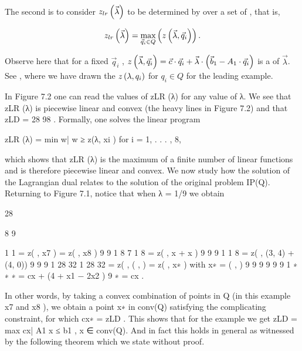 \paragraph{}
The second  is to consider $z_{lr}\left( \vec{\lambda} \right)$ to be determined by  over a set of , that is,

\begin{equation}
z_{lr}\left( \vec{\lambda} \right)=\max_{\vec{q}_i\in Q}\left( z\left( \vec{\lambda},\vec{q}_i \right) \right).
\end{equation}

Observe here that for a fixed $\vec{q}_i$ , $z\left( \vec{\lambda},\vec{q}_i \right)=\vec{c}\cdot\vec{q}_i+\vec{\lambda}\cdot\left( \vec{b}_1-A_1\cdot\vec{q}_i \right)$ is a  of $\vec{\lambda}$. See , where we have drawn the  $z\left( \lambda,q_i \right)$ for $q_i\in Q$ for the leading example.



In Figure 7.2 one can read the values of zLR (λ) for any value of λ. We see that zLR (λ) is piecewise linear
and convex (the heavy lines in Figure 7.2) and that zLD = 28 98 . Formally, one solves the linear program

zLR (λ) = min {w| w ≥ z(λ, xi ) for i = 1, . . . , 8},

which shows that zLR (λ) is the maximum of a finite number of linear functions and is therefore piecewise
linear and convex.
We now study how the solution of the Lagrangian dual relates to the solution of the original problem
IP(Q). Returning to Figure 7.1, notice that when λ = 1/9 we obtain

28

8
9

1
1
= z( , x7 ) = z( , x8 )
9
9
1 8 7 1 8
= z( , x + x )
9 9
9
1
1 8
= z( , (3, 4) + (4, 0))
9 9
9
1 28 32
1
28 32
= z( , ( , ) = z( , x∗ ) with x∗ = ( , )
9 9 9
9
9 9
1
∗
∗
∗
= cx + (4 + x1 − 2x2 )
9
∗
= cx .

In other words, by taking a convex combination of points in Q (in this example x7 and x8 ), we obtain a
point x∗ in conv(Q) satisfying the complicating constraint, for which cx∗ = zLD . This shows that for the
example we get zLD = max {cx| A1 x ≤ b1 , x ∈ conv(Q)}. And in fact this holds in general as witnessed
by the following theorem which we state without proof.

